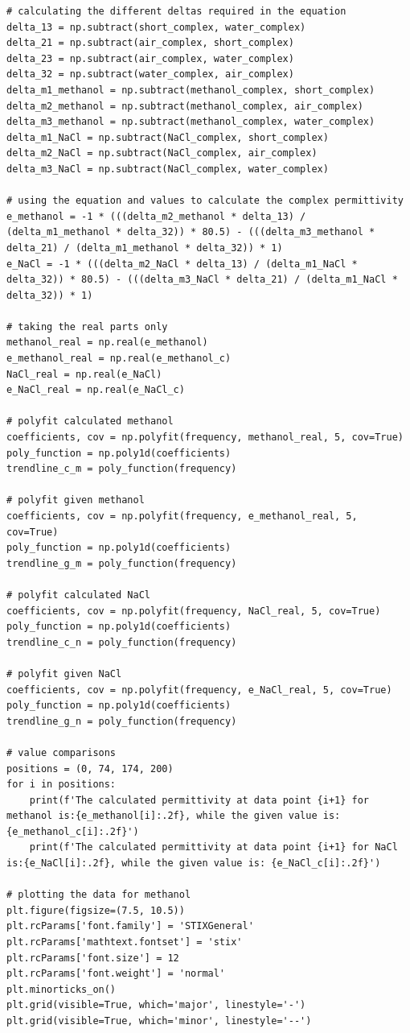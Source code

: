 \documentclass[12pt, a4paper]{article}
\begin{document}
\begin{verbatim}
# calculating the different deltas required in the equation
delta_13 = np.subtract(short_complex, water_complex)
delta_21 = np.subtract(air_complex, short_complex)
delta_23 = np.subtract(air_complex, water_complex)
delta_32 = np.subtract(water_complex, air_complex)
delta_m1_methanol = np.subtract(methanol_complex, short_complex)
delta_m2_methanol = np.subtract(methanol_complex, air_complex)
delta_m3_methanol = np.subtract(methanol_complex, water_complex)
delta_m1_NaCl = np.subtract(NaCl_complex, short_complex)
delta_m2_NaCl = np.subtract(NaCl_complex, air_complex)
delta_m3_NaCl = np.subtract(NaCl_complex, water_complex)

# using the equation and values to calculate the complex permittivity
e_methanol = -1 * (((delta_m2_methanol * delta_13) / (delta_m1_methanol * delta_32)) * 80.5) - (((delta_m3_methanol * delta_21) / (delta_m1_methanol * delta_32)) * 1)
e_NaCl = -1 * (((delta_m2_NaCl * delta_13) / (delta_m1_NaCl * delta_32)) * 80.5) - (((delta_m3_NaCl * delta_21) / (delta_m1_NaCl * delta_32)) * 1)

# taking the real parts only
methanol_real = np.real(e_methanol)
e_methanol_real = np.real(e_methanol_c)
NaCl_real = np.real(e_NaCl)
e_NaCl_real = np.real(e_NaCl_c)

# polyfit calculated methanol
coefficients, cov = np.polyfit(frequency, methanol_real, 5, cov=True)
poly_function = np.poly1d(coefficients)
trendline_c_m = poly_function(frequency)

# polyfit given methanol
coefficients, cov = np.polyfit(frequency, e_methanol_real, 5, cov=True)
poly_function = np.poly1d(coefficients)
trendline_g_m = poly_function(frequency)

# polyfit calculated NaCl
coefficients, cov = np.polyfit(frequency, NaCl_real, 5, cov=True)
poly_function = np.poly1d(coefficients)
trendline_c_n = poly_function(frequency)

# polyfit given NaCl
coefficients, cov = np.polyfit(frequency, e_NaCl_real, 5, cov=True)
poly_function = np.poly1d(coefficients)
trendline_g_n = poly_function(frequency)

# value comparisons
positions = (0, 74, 174, 200)
for i in positions:
    print(f'The calculated permittivity at data point {i+1} for methanol is:{e_methanol[i]:.2f}, while the given value is: {e_methanol_c[i]:.2f}')
    print(f'The calculated permittivity at data point {i+1} for NaCl is:{e_NaCl[i]:.2f}, while the given value is: {e_NaCl_c[i]:.2f}')

# plotting the data for methanol
plt.figure(figsize=(7.5, 10.5))
plt.rcParams['font.family'] = 'STIXGeneral'
plt.rcParams['mathtext.fontset'] = 'stix'
plt.rcParams['font.size'] = 12
plt.rcParams['font.weight'] = 'normal'
plt.minorticks_on()
plt.grid(visible=True, which='major', linestyle='-')
plt.grid(visible=True, which='minor', linestyle='--')


\end{verbatim}
\end{document}
